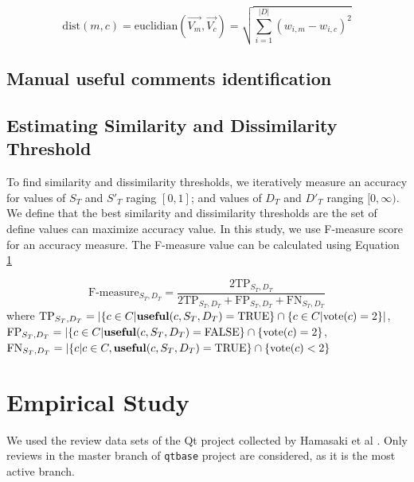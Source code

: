 \documentclass[conference]{IEEEtran}
\begin{document}
\begin{equation}
\mathrm{dist}(m,c) = \mathrm{euclidian}(\overrightarrow{V_m},\overrightarrow{V_c}) = \sqrt{\sum_{i=1}^{|D|}(w_{i,m} - w_{i,c})^2}
\label{eq:euclid}
\end{equation}
\subsection{Manual useful comments identification}

\subsection{Estimating Similarity and Dissimilarity Threshold}
To find similarity and dissimilarity thresholds, we iteratively measure an accuracy for values of $S_T$ and $S'_T$ raging $[0,1]$; and values of $D_T$ and $D'_T$ ranging $[0,\infty)$. We define that the best similarity and dissimilarity thresholds are the set of define values can maximize accuracy value. In this study, we use F-measure score for an accuracy measure. The F-measure value can be calculated using Equation \ref{}

\begin{equation}
\mathrm{F\text{-}measure}_{S_T,D_T} = \frac{2\mathrm{TP}_{S_T,D_T}}{2\mathrm{TP}_{S_T,D_T}+\mathrm{FP}_{S_T,D_T}+\mathrm{FN}_{S_T,D_T}}
\label{eq:precision}
\end{equation}
where $\mathrm{TP}_{S_T,D_T}= |\{ c \in C |  \text{\textbf{useful}}(c,S_T,D_T) = \mathrm{TRUE} \}\cap \{c \in C| \mathrm{vote}(c) = 2\}|$,  $\mathrm{FP}_{S_T,D_T} = |\{ c \in C | \text{\textbf{useful}}(c,S_T,D_T) = \mathrm{FALSE} \}\cap \{\mathrm{vote}(c) = 2\} $, $\mathrm{FN}_{S_T,D_T} = |\{ c | c \in C, \text{\textbf{useful}}(c,S_T,D_T) = \mathrm{TRUE} \}\cap \{\mathrm{vote}(c) < 2\} $







\section{Empirical Study}

We used the review data sets of the Qt project collected by Hamasaki et al .
Only reviews in the master branch of \texttt{qtbase} project are considered,
as it is the most active branch.
\end{document}
